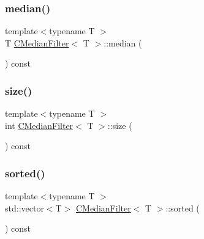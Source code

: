 \mbox{\label{class_c_median_filter_ade078740cdd0555adc2e52468d090c42}} 
\subsubsection{\texorpdfstring{median()}{median()}}
{\footnotesize\ttfamily template$<$typename T $>$ \\
T \mbox{\hyperlink{class_c_median_filter}{C\+Median\+Filter}}$<$ T $>$\+::median (\begin{DoxyParamCaption}{ }\end{DoxyParamCaption}) const\hspace{0.3cm}{\ttfamily [inline]}}

\mbox{\label{class_c_median_filter_a618073c8aa8504670182d40d7084501c}} 
\subsubsection{\texorpdfstring{size()}{size()}}
{\footnotesize\ttfamily template$<$typename T $>$ \\
int \mbox{\hyperlink{class_c_median_filter}{C\+Median\+Filter}}$<$ T $>$\+::size (\begin{DoxyParamCaption}{ }\end{DoxyParamCaption}) const\hspace{0.3cm}{\ttfamily [inline]}}

\mbox{\label{class_c_median_filter_a2ec3e6107c12dc2564f0323d39ecca1e}} 
\subsubsection{\texorpdfstring{sorted()}{sorted()}}
{\footnotesize\ttfamily template$<$typename T $>$ \\
std\+::vector$<$T$>$ \mbox{\hyperlink{class_c_median_filter}{C\+Median\+Filter}}$<$ T $>$\+::sorted (\begin{DoxyParamCaption}{ }\end{DoxyParamCaption}) const\hspace{0.3cm}{\ttfamily [inline]}}



